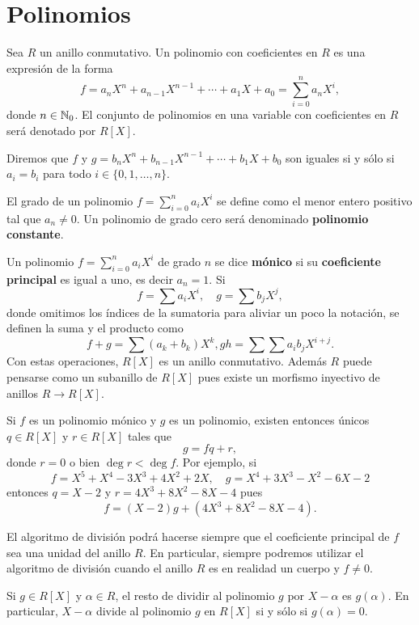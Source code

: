 \chapter{Polinomios}

Sea $R$ un anillo conmutativo. 
Un polinomio con coeficientes en $R$ es una expresión
de la forma
\[
	f=a_nX^n+a_{n-1}X^{n-1}+\cdots+a_1X+a_0=\sum_{i=0}^n a_nX^i,
\]
donde $n\in\mathbb{N}_0$. El conjunto de polinomios en una variable 
con coeficientes en $R$ será denotado por $R[X]$. 

Diremos que $f$ y $g=b_nX^n+b_{n-1}X^{n-1}+\cdots+b_1X+b_0$ son iguales si y
sólo si $ a_i=b_i$ para todo $i\in\{0,1,\dots,n\}$. 

El grado de un polinomio $f=\sum_{i=0}^na_iX^i$ se define como el menor entero positivo tal que $a_n\ne0$. Un polinomio de grado cero
será denominado \textbf{polinomio constante}.

Un polinomio $f=\sum_{i=0}^na_iX^i$ de grado $n$ se dice \textbf{mónico} si su \textbf{coeficiente principal} es igual a uno, es decir $a_n=1$.   
Si 
\[
f=\sum a_iX^i,\quad
g=\sum b_jX^j,
\]
donde omitimos los índices de la sumatoria para aliviar un poco la notación, se definen la
suma y el producto como
\[
f+g=\sum (a_k+b_k)X^k,
gh=\sum\sum a_ib_jX^{i+j}.
\]
Con estas operaciones, $R[X]$ es un anillo conmutativo. Además $R$ puede pensarse como un subanillo de $R[X]$ pues
existe un morfismo inyectivo de anillos $R\to R[X]$.  

\begin{example}
Si $f$ es un polinomio mónico y $g$ es un polinomio, existen entonces únicos $q\in R[X]$ y $r\in R[X]$ tales que
\[
g=fq+r,
\]
donde $r=0$ o bien $\deg r<\deg f$. Por ejemplo, si
\[
f=X^5+X^4-3X^3+4X^2+2X,\quad
g=X^4+3X^3-X^2-6X-2
\]
entonces $q=X-2$ y $r=4X^3+8X^2-8X-4$ pues 
\[
f=(X-2)g+(4X^3+8X^2-8X-4).
\]
\end{example}

El algoritmo de división podrá hacerse siempre que el coeficiente principal de $f$ sea una unidad del anillo $R$. En particular, siempre podremos
utilizar el algoritmo de división cuando el anillo $R$ es en realidad un cuerpo y $f\ne 0$.  

\begin{proposition}
Si $g\in R[X]$ y $\alpha\in R$, el resto de dividir al polinomio $g$ por $X-\alpha$ es $g(\alpha)$. En particular, $X-\alpha$ divide al polinomio  
$g$ en $R[X]$ si y sólo si $g(\alpha)=0$. 
\end{proposition}

